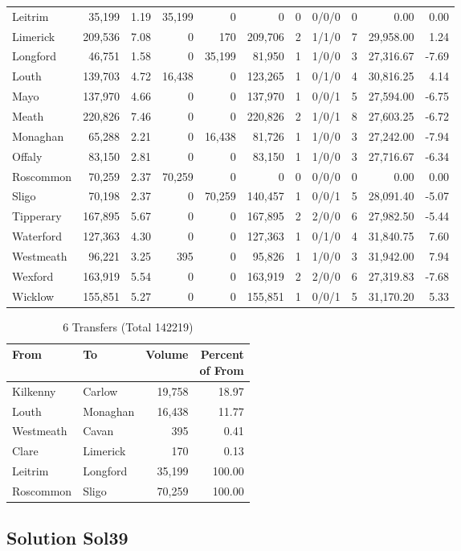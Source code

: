 \documentclass[a4paper]{article}
\begin{document}
\begin{longtable}{lrrrrrrlrrr}
Leitrim&35,199& 1.19&35,199&0&0&0&0/0/0&0& 0.00& 0.00\\ 
Limerick&209,536& 7.08&0&170&209,706&2&1/1/0&7&29,958.00& 1.24\\ 
Longford&46,751& 1.58&0&35,199&81,950&1&1/0/0&3&27,316.67&-7.69\\ 
Louth&139,703& 4.72&16,438&0&123,265&1&0/1/0&4&30,816.25& 4.14\\ 
Mayo&137,970& 4.66&0&0&137,970&1&0/0/1&5&27,594.00&-6.75\\ 
Meath&220,826& 7.46&0&0&220,826&2&1/0/1&8&27,603.25&-6.72\\ 
Monaghan&65,288& 2.21&0&16,438&81,726&1&1/0/0&3&27,242.00&-7.94\\ 
Offaly&83,150& 2.81&0&0&83,150&1&1/0/0&3&27,716.67&-6.34\\ 
Roscommon&70,259& 2.37&70,259&0&0&0&0/0/0&0& 0.00& 0.00\\ 
Sligo&70,198& 2.37&0&70,259&140,457&1&0/0/1&5&28,091.40&-5.07\\ 
Tipperary&167,895& 5.67&0&0&167,895&2&2/0/0&6&27,982.50&-5.44\\ 
Waterford&127,363& 4.30&0&0&127,363&1&0/1/0&4&31,840.75& 7.60\\ 
Westmeath&96,221& 3.25&395&0&95,826&1&1/0/0&3&31,942.00& 7.94\\ 
Wexford&163,919& 5.54&0&0&163,919&2&2/0/0&6&27,319.83&-7.68\\ 
Wicklow&155,851& 5.27&0&0&155,851&1&0/0/1&5&31,170.20& 5.33\\ 
\end{longtable}

\begin{table}[htbp]
\caption{6 Transfers (Total 142219)}
\centering
\begin{tabular}{llrr} \toprule
From &To &Volume &\shortstack{Percent\\of From} \\ \midrule
Kilkenny&Carlow&19,758&18.97\\ 
Louth&Monaghan&16,438&11.77\\ 
Westmeath&Cavan&395& 0.41\\ 
Clare&Limerick&170& 0.13\\ 
Leitrim&Longford&35,199&100.00\\ 
Roscommon&Sligo&70,259&100.00\\ 
\bottomrule
\end{tabular}
\end{table}

\clearpage
\subsection{Solution Sol39}
\end{document}
